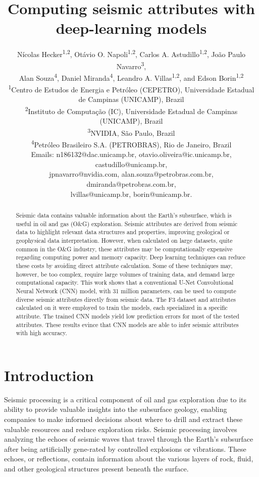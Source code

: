 \documentclass[conference]{IEEEtran}
\title{Computing seismic attributes with deep-learning models}
\author{Nícolas Hecker\textsuperscript{1,2}, Otávio O. Napoli\textsuperscript{1,2}, Carlos A. Astudillo\textsuperscript{1,2}, 
João Paulo Navarro\textsuperscript{3}, \\ 
Alan Souza\textsuperscript{4}, Daniel Miranda\textsuperscript{4},
Leandro A. Villas\textsuperscript{1,2}, and Edson Borin\textsuperscript{1,2}\\%
\textsuperscript{1}Centro de Estudos de Energia e Petróleo (CEPETRO), Universidade Estadual de Campinas (UNICAMP), Brazil\\
\textsuperscript{2}Instituto de Computação (IC), Universidade Estadual de Campinas (UNICAMP), Brazil\\
\textsuperscript{3}NVIDIA, São Paulo, Brazil\\ %
\textsuperscript{4}Petróleo Brasileiro S.A. (PETROBRAS), Rio de Janeiro, Brazil\\
Emails: n186132@dac.unicamp.br, otavio.oliveira@ic.unicamp.br, castudillo@unicamp.br,  \\ jpnavarro@nvidia.com, alan.souza@petrobras.com.br, dmiranda@petrobras.com.br, \\ lvillas@unicamp.br, borin@unicamp.br.   
}
\def\unet{\mbox{U-Net}\xspace}
\begin{document}
\maketitle

\begin{abstract}
    Seismic data contains valuable information about the Earth's subsurface, which is useful in oil and gas (O\&G) exploration. 
    Seismic attributes are derived from seismic data to highlight relevant data structures and properties, improving geological or geophysical data interpretation.
    However, when calculated on large datasets, quite common in the O\&G industry, these attributes may be computationally expensive regarding computing power and memory capacity.
    Deep learning techniques can reduce these costs by avoiding direct attribute calculation. 
    Some of these techniques may, however, be too complex, require large volumes of training data, and demand large computational capacity.
    This work shows that a conventional \unet Convolutional Neural Network (CNN) model, with 31 million parameters, can be used to compute diverse seismic attributes directly from seismic data. 
    The F3 dataset and attributes calculated on it were employed to train the models, each specialized in a specific attribute. 
    The trained CNN models yield low prediction errors for most of the tested attributes. 
    These results evince that  CNN models are able to infer seismic attributes with high accuracy.
\end{abstract}

\section{Introduction}



Seismic processing is a critical component of oil and gas exploration due to its ability to provide valuable insights into the subsurface geology, enabling companies to make informed decisions about where to drill and extract these valuable resources and reduce exploration risks. 
Seismic processing involves analyzing the echoes of seismic waves that travel through the Earth's subsurface after being artificially gene-rated by controlled explosions or vibrations. These echoes, or reflections, contain information about the various layers of rock, fluid, and other geological structures present beneath the surface. 
\end{document}
